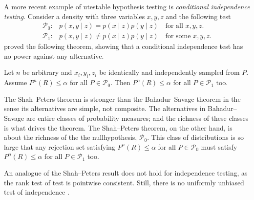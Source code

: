A more recent example of utestable hypothesis testing is \emph{conditional
independence testing}. Consider a density with three variables $x,y,z$
and the following test
\begin{align*}
\mathcal{P}_{0}: & p(x,y\mid z)=p(x\mid z)p(y\mid z)\quad\textrm{for all }x,y,z.\\
\mathcal{P}_{1}: & p(x,y\mid z)\neq p(x\mid z)p(y\mid z)\quad\textrm{for some }x,y,z.
\end{align*}
\textcite{Shah2018-jh} proved the following theorem, showing that a
conditional independence test has no power against any alternative. 
\begin{theorem}
\label{theorem:Shah--Peters}Let $n$ be arbitrary and $x_{i},y_{i},z_{i}$
be identically and independently sampled from $P$. Assume $P^{n}(R)\leq\alpha$
for all $P\in\mathcal{P}_{0}$. Then $P^{n}(R)\leq\alpha$ for all
$P\in\mathcal{P}_{1}$ too.
\end{theorem}

The Shah--Peters theorem is stronger than the Bahadur--Savage theorem
in the sense its alternatives are simple, not composite. The alternatives
in Bahadur--Savage are entire classes of probability measures; and
the richness of these classes is what drives the theorem. The Shah--Peters
theorem, on the other hand, is about the richness of the the nullhypothesis,
$\mathcal{P}_{0}$. This class of distributions is so large that any
rejection set satisfying $P^{n}(R)\leq\alpha$ for all $P\in\mathcal{P}_{0}$
must satisfy $P^{n}(R)\leq\alpha$ for all $P\in\mathcal{P}_{1}$
too.

An analogue of the Shah--Peters result does not hold for independence
testing, as the rank test of \textcite{Hoeffding1948-nm} test is pointwise
consistent. Still, there is no uniformly unbiased test of independence \parencite{Moss2020-bc}.

